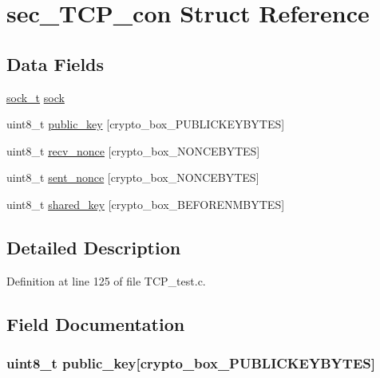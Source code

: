 \hypertarget{structsec___t_c_p__con}{\section{sec\+\_\+\+T\+C\+P\+\_\+con Struct Reference}
\label{structsec___t_c_p__con}
}
\subsection*{Data Fields}
\begin{DoxyCompactItemize}
\item 
\hyperlink{network_8h_ae5faf8a8d23da59c3e3025a62039d8c1}{sock\+\_\+t} \hyperlink{structsec___t_c_p__con_a35b19d84fb632ca8ce5cab237f7089a5}{sock}
\item 
uint8\+\_\+t \hyperlink{structsec___t_c_p__con_aaa806bb1136fb3d4b5d8d8970b596ff7}{public\+\_\+key} \mbox{[}crypto\+\_\+box\+\_\+\+P\+U\+B\+L\+I\+C\+K\+E\+Y\+B\+Y\+T\+E\+S\mbox{]}
\item 
uint8\+\_\+t \hyperlink{structsec___t_c_p__con_aae0467706f97aa3ef23e5dc9c3c199d7}{recv\+\_\+nonce} \mbox{[}crypto\+\_\+box\+\_\+\+N\+O\+N\+C\+E\+B\+Y\+T\+E\+S\mbox{]}
\item 
uint8\+\_\+t \hyperlink{structsec___t_c_p__con_a9df0e00e8f493ed6cd1ff45e7da33c0d}{sent\+\_\+nonce} \mbox{[}crypto\+\_\+box\+\_\+\+N\+O\+N\+C\+E\+B\+Y\+T\+E\+S\mbox{]}
\item 
uint8\+\_\+t \hyperlink{structsec___t_c_p__con_a81ead9fac55a0cedc30a96253a2c5119}{shared\+\_\+key} \mbox{[}crypto\+\_\+box\+\_\+\+B\+E\+F\+O\+R\+E\+N\+M\+B\+Y\+T\+E\+S\mbox{]}
\end{DoxyCompactItemize}


\subsection{Detailed Description}


Definition at line 125 of file T\+C\+P\+\_\+test.\+c.



\subsection{Field Documentation}
\hypertarget{structsec___t_c_p__con_aaa806bb1136fb3d4b5d8d8970b596ff7}{
\subsubsection[{public\+\_\+key}]{\setlength{\rightskip}{0pt plus 5cm}uint8\+\_\+t public\+\_\+key\mbox{[}crypto\+\_\+box\+\_\+\+P\+U\+B\+L\+I\+C\+K\+E\+Y\+B\+Y\+T\+E\+S\mbox{]}}}\label{structsec___t_c_p__con_aaa806bb1136fb3d4b5d8d8970b596ff7}


